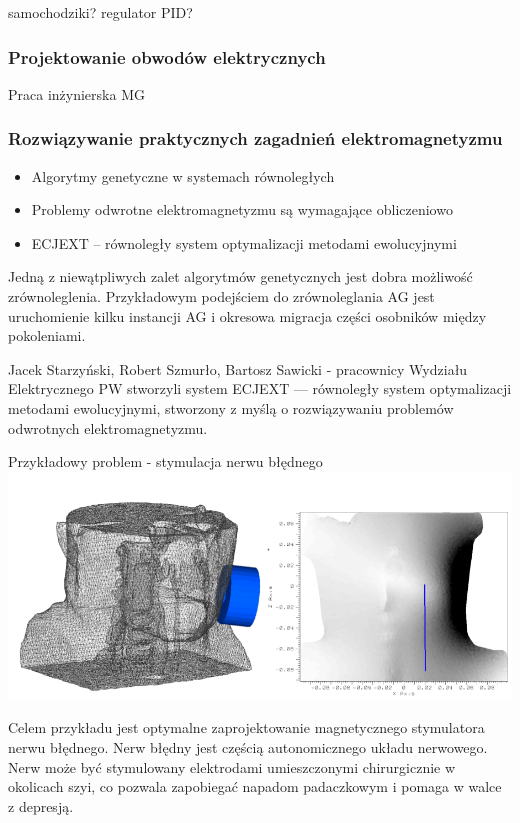 \documentclass{article}
\begin{document}
samochodziki? regulator PID?

    \subsubsection{Projektowanie obwodów elektrycznych}

Praca inżynierska MG

    \subsubsection{Rozwiązywanie praktycznych zagadnień elektromagnetyzmu}

\begin{itemize}
\item
  Algorytmy genetyczne w systemach równoległych
\item
  Problemy odwrotne elektromagnetyzmu są wymagające obliczeniowo
\item
  ECJEXT -- równoległy system optymalizacji metodami ewolucyjnymi
\end{itemize}

    Jedną z niewątpliwych zalet algorytmów genetycznych jest dobra możliwość
zrównoleglenia. Przykładowym podejściem do zrównoleglania AG jest
uruchomienie kilku instancji AG i okresowa migracja części osobników
między pokoleniami.

Jacek Starzyński, Robert Szmurło, Bartosz Sawicki - pracownicy Wydziału
Elektrycznego PW stworzyli system ECJEXT --- równoległy system
optymalizacji metodami ewolucyjnymi, stworzony z myślą o rozwiązywaniu
problemów odwrotnych elektromagnetyzmu.

    Przykładowy problem - stymulacja nerwu błędnego
\includegraphics{pics/ecjext-mesh.png}

    Celem przykładu jest optymalne zaprojektowanie magnetycznego stymulatora
nerwu błędnego. Nerw błędny jest częścią autonomicznego układu
nerwowego. Nerw może być stymulowany elektrodami umieszczonymi
chirurgicznie w okolicach szyi, co pozwala zapobiegać napadom
padaczkowym i pomaga w walce z depresją.
\end{document}
